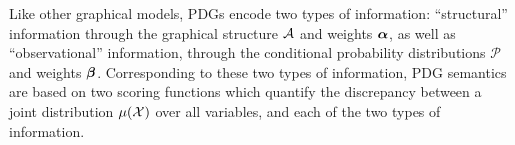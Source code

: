 \documentclass[twoside]{article}
\newcommand\discard[1]{}
\begin{document}
\discard{
One selling point of PDGs is their modularity:
 if $\dg M_1$ and $\dg M_2$ are two PDGs, we can take the dusjoint union of their arcs (and associated data) to get a new PDG, denoted $\dg M_1 + \dg M_2$,
which represents the combined information of both $\dg M_1$ and $\dg M_2$.
}


Like other graphical models,
PDGs encode two types of information: ``structural'' information 
through the graphical structure $\mathcal A$ and weights $\boldsymbol\alpha$,
as well as ``observational'' information, 
through the conditional probability distributions
$\mathcal P$ and weights $\boldsymbol\beta$. 
Corresponding to these two types of information, 
PDG semantics are based on two scoring functions 
which quantify the discrepancy between 
a joint distribution $\mu(\mathcal X)$ over all variables,
and each of the two types of information.
\end{document}
